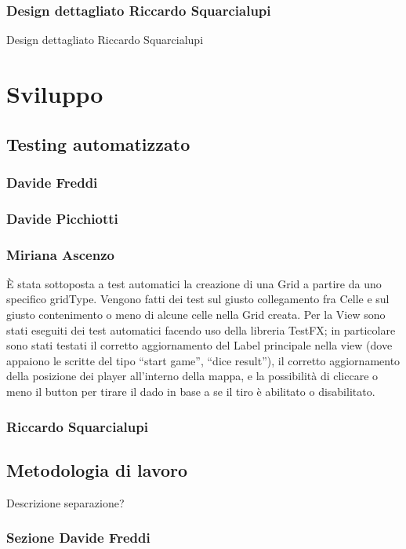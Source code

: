 \documentclass[a4paper,12pt]{report}
\begin{document}
	\subsection{Design dettagliato Riccardo Squarcialupi}
	Design dettagliato Riccardo Squarcialupi

	\chapter{Sviluppo}
	\section{Testing automatizzato}

	\subsection{Davide Freddi}
	\subsection{Davide Picchiotti}
	\subsection{Miriana Ascenzo}

	È stata sottoposta a test automatici la creazione di una Grid a partire da uno specifico gridType.
	Vengono fatti dei test sul giusto collegamento fra Celle e sul giusto contenimento o meno di alcune celle nella Grid creata.
	Per la View sono stati eseguiti dei test automatici facendo uso della libreria TestFX; in particolare sono stati testati il corretto aggiornamento del Label principale nella view (dove appaiono le scritte del tipo “start game”, “dice result”),
	il corretto aggiornamento della posizione dei player all'interno della mappa, e la possibilità di cliccare o meno il button per tirare il dado in base a se il tiro è abilitato o disabilitato.


	\subsection{Riccardo Squarcialupi}

	\section{Metodologia di lavoro}

	Descrizione separazione?

	\subsection{Sezione Davide Freddi}
\end{document}

